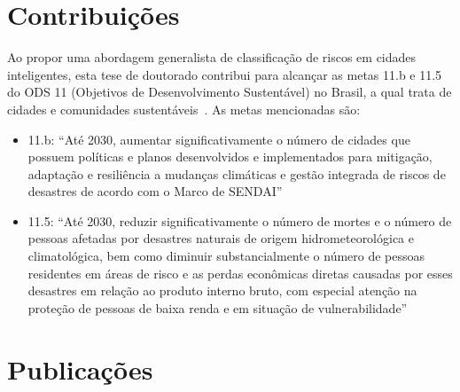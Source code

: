 \begin{refsection}
\section{Contribuições}\label{sec:contribuicoes}

Ao propor uma abordagem generalista de classificação de riscos em cidades inteligentes, esta tese de doutorado contribui para alcançar as metas 11.b e 11.5 do ODS 11 (Objetivos de Desenvolvimento Sustentável) no Brasil, a qual trata de cidades e comunidades sustentáveis~\cite{ipeaods}. As metas mencionadas são:

\begin{itemize}
  \item 11.b: ``Até 2030, aumentar significativamente o número de cidades que possuem políticas e planos desenvolvidos e implementados para mitigação, adaptação e resiliência a mudanças climáticas e gestão integrada de riscos de desastres de acordo com o Marco de SENDAI''
  \item 11.5: ``Até 2030, reduzir significativamente o número de mortes e o número de pessoas afetadas por desastres naturais de origem hidrometeorológica e climatológica, bem como diminuir substancialmente o número de pessoas residentes em áreas de risco e as perdas econômicas diretas causadas por esses desastres em relação ao produto interno bruto, com especial atenção na proteção de pessoas de baixa renda e em situação de vulnerabilidade''
\end{itemize}



\section{Publicações}\label{sec:publicacoes}


\end{refsection}
